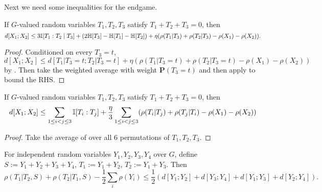 Next we need some inequalities for the endgame.

\begin{lemma}\label{rho-BSG-triplet}\leanok
  If $G$-valued random variables $T_1,T_2,T_3$ satisfy $T_1+T_2+T_3=0$, then
  $$d[X_1;X_2]\le 3\mathbb{I}[T_1:T_2\mid T_3] + (2\mathbb{H}[T_3]-\mathbb{H}[T_1]-\mathbb{H}[T_2])+ \eta(\rho(T_1|T_3)+\rho(T_2|T_3)-\rho(X_1)-\rho(X_2)).$$
\end{lemma}

\begin{proof}
  Conditioned on every $T_3=t$, $d[X_1;X_2]\le d[T_1|T_3=t;T_2|T_3=t]+\eta(\rho(T_1|T_3=t)+\rho(T_2|T_3=t)-\rho(X_1)-\rho(X_2))$ by . Then take the weighted average with weight $\mathbf{P}(T_3=t)$ and then apply  to bound the RHS.
\end{proof}

\begin{lemma}\label{rho-BSG-triplet-symmetrized}\leanok
  If $G$-valued random variables $T_1,T_2,T_3$ satisfy $T_1+T_2+T_3=0$, then
  $$d[X_1;X_2] \leq  \sum_{1 \leq i<j \leq 3} \mathbb{I}[T_i:T_j] + \frac{\eta}{3}   \sum_{1 \leq i<j \leq 3} (\rho(T_i|T_j) + \rho(T_j|T_i) -\rho(X_1)-\rho(X_2))$$
\end{lemma}

\begin{proof}
  Take the average of  over all $6$ permutations of $T_1,T_2,T_3$.
\end{proof}


\begin{lemma}\label{rho-increase}\leanok
  For independent random variables $Y_1,Y_2,Y_3,Y_4$ over $G$, define $S:=Y_1+Y_2+Y_3+Y_4$, $T_1:=Y_1+Y_2$, $T_2:=Y_1+Y_3$. Then
  $$\rho(T_1|T_2,S)+\rho(T_2|T_1,S) - \frac{1}{2}\sum_{i} \rho(Y_i)\le \frac{1}{2}(d[Y_1;Y_2]+d[Y_3;Y_4]+d[Y_1;Y_3]+d[Y_2;Y_4]).$$
\end{lemma}

